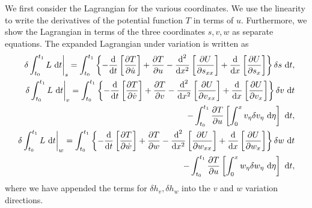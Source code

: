 We first consider the Lagrangian for the various coordinates. We use the linearity to write the derivatives of the potential function $T$ in terms of $u$. Furthermore, we show the Lagrangian in terms of the three coordinates $s,v,w$ as separate equations. The expanded Lagrangian under variation is written as
\begin{eqnarray}
\left.\delta\int_{t_0}^{t_1}L\text{ d}t\right|_s = \int_{t_0}^{t_1}\left\lbrace-\frac{\text d}{\text dt}\left[\frac{\partial T}{\partial \dot u}\right]+\frac{\partial T}{\partial u} - \frac{\text d^2}{\text dx^2}\left[\frac{\partial U}{\partial s_{xx}}\right]+\frac{\text d}{\text dx}\left[\frac{\partial  U}{\partial s_{x}}\right]\right\rbrace\delta s\text{ d}t,\\
\left.\delta\int_{t_0}^{t_1}L\text{ d}t\right|_v =\int_{t_0}^{t_1}\left\lbrace-\frac{\text d}{\text dt}\left[\frac{\partial T}{\partial \dot v}\right]+\frac{\partial T}{\partial v} - \frac{\text d^2}{\text dx^2}\left[\frac{\partial U}{\partial v_{xx}}\right]+\frac{\text d}{\text dx}\left[\frac{\partial  U}{\partial v_{x}}\right]\right\rbrace\delta v\text{ d}t\\
-\int_{t_0}^{t_1}\frac{\partial T}{\partial u}\left[\int_0^xv_{\eta}\delta v_{\eta}\text{ d}\eta\right]\text{ d}t,\nonumber\\
\left.\delta\int_{t_0}^{t_1}L\text{ d}t\right|_w =\int_{t_0}^{t_1}\left\lbrace-\frac{\text d}{\text dt}\left[\frac{\partial T}{\partial \dot w}\right]+\frac{\partial T}{\partial w} - \frac{\text d^2}{\text dx^2}\left[\frac{\partial U}{\partial w_{xx}}\right]+\frac{\text d}{\text dx}\left[\frac{\partial  U}{\partial w_{x}}\right]\right\rbrace\delta w\text{ d}t\\
-\int_{t_0}^{t_1}\frac{\partial T}{\partial u}\left[\int_0^xw_{\eta}\delta w_{\eta}\text{ d}\eta\right]\text{ d}t,\nonumber
\end{eqnarray}
where we have appended the terms for $\delta h_v,\delta h_w$ into the $v$ and $w$ variation directions.

